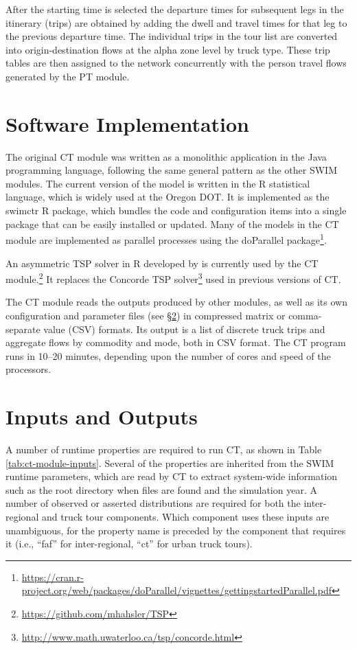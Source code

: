 After the starting time is selected the departure times for subsequent legs in the itinerary (trips) are obtained by adding the dwell and travel times for that leg to the previous departure time. The individual trips in the tour list are converted into origin-destination flows at the alpha zone level by truck type. These trip tables are then assigned to the network concurrently with the person travel flows generated by the PT module.




\section{Software Implementation}
The original CT module was written as a monolithic application in the Java programming language, following the same general pattern as the other SWIM modules. The current version of the model is written in the R statistical language, which is widely used at the Oregon DOT. It is implemented as the swimctr R package, which bundles the code and configuration items into a single package that can be easily installed or updated. Many of the models in the CT module are implemented as parallel processes using the doParallel package\footnote{\url{https://cran.r-project.org/web/packages/doParallel/vignettes/gettingstartedParallel.pdf}}.

An asymmetric TSP solver in R developed by \cite{hahsler07} is currently used by the CT module.\footnote{\url{https://github.com/mhahsler/TSP}} It replaces the Concorde TSP solver\footnote{\url{http://www.math.uwaterloo.ca/tsp/concorde.html}} used in previous versions of CT. 

The CT module reads the outputs produced by other modules, as well as its own configuration and parameter files (see \S\ref{sec:ct-input-output}) in compressed matrix or comma-separate value (CSV) formats. Its output is a list of discrete truck trips and aggregate flows by commodity and mode, both in CSV format. The CT program runs in 10--20 minutes, depending upon the number of cores and speed of the processors. 

\section{Inputs and Outputs}\label{sec:ct-input-output}
A number of runtime properties are required to run CT, as shown in Table \ref{tab:ct-module-inputs}. Several of the properties are inherited from the SWIM runtime parameters, which are read by CT to extract system-wide information such as the root directory when files are found and the simulation year. A number of observed or asserted distributions are required for both the inter-regional and truck tour components. Which component uses these inputs are unambiguous, for the property name is preceded by the component that requires it (i.e., ``faf'' for inter-regional, ``ct'' for urban truck tours).


